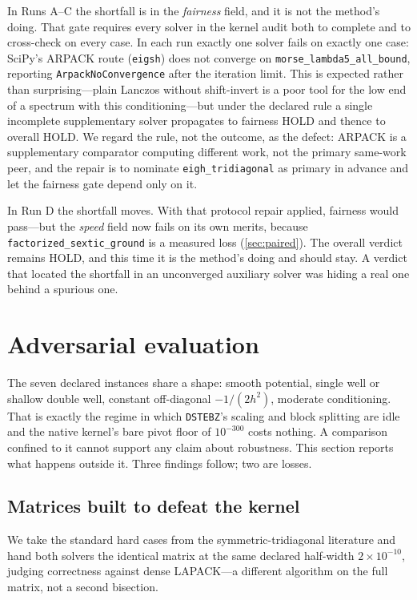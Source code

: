 \documentclass[twocolumn,10pt,a4paper]{article}
\theoremstyle{plain}
\theoremstyle{definition}
\newcommand{\HOLD}{\textsf{HOLD}}
\begin{document}
In Runs A--C the shortfall is in the \emph{fairness} field, and it is not the
method's doing. That gate requires every solver in the kernel audit both to
complete and to cross-check on every case. In each run exactly one solver fails
on exactly one case: SciPy's ARPACK route (\texttt{eigsh}) does not converge on
\texttt{morse\_lambda5\_all\_bound}, reporting \texttt{ArpackNoConvergence}
after the iteration limit. This is expected rather than surprising---plain
Lanczos without shift-invert is a poor tool for the low end of a spectrum with
this conditioning---but under the declared rule a single incomplete
supplementary solver propagates to fairness \HOLD{} and thence to overall
\HOLD{}. We regard the rule, not the outcome, as the defect: ARPACK is a
supplementary comparator computing different work, not the primary same-work
peer, and the repair is to nominate \texttt{eigh\_tridiagonal} as primary in
advance and let the fairness gate depend only on it.

In Run D the shortfall moves. With that protocol repair applied, fairness would
pass---but the \emph{speed} field now fails on its own merits, because
\texttt{factorized\_sextic\_ground} is a measured loss
(\cref{sec:paired}). The overall verdict remains \HOLD{}, and this time it is
the method's doing and should stay. A verdict that located the shortfall in an
unconverged auxiliary solver was hiding a real one behind a spurious one.

\section{Adversarial evaluation}
\label{sec:adversarial}

The seven declared instances share a shape: smooth potential, single well or
shallow double well, constant off-diagonal $-1/(2h^{2})$, moderate conditioning.
That is exactly the regime in which \texttt{DSTEBZ}'s scaling and block
splitting \citep{demmel1995} are idle and the native kernel's bare pivot floor
of $10^{-300}$ costs nothing. A comparison confined to it cannot support any
claim about robustness. This section reports what happens outside it. Three
findings follow; two are losses.

\subsection{Matrices built to defeat the kernel}
\label{sec:advmatrix}

We take the standard hard cases from the symmetric-tridiagonal literature and
hand both solvers the identical matrix at the same declared half-width
$2\times10^{-10}$, judging correctness against dense LAPACK---a different
algorithm on the full matrix, not a second bisection.
\end{document}
